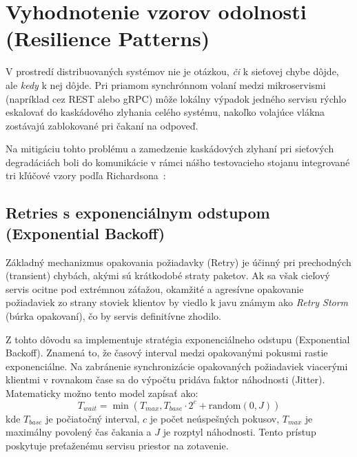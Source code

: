\section{Vyhodnotenie vzorov odolnosti (Resilience Patterns)} \label{s: vzory}

V prostredí distribuovaných systémov nie je otázkou, \textit{či} k sieťovej chybe dôjde, ale \textit{kedy} k nej dôjde. Pri priamom synchrónnom volaní medzi mikroservismi (napríklad cez REST alebo gRPC) môže lokálny výpadok jedného servisu rýchlo eskalovať do kaskádového zlyhania celého systému, nakoľko volajúce vlákna zostávajú zablokované pri čakaní na odpoveď.

Na mitigáciu tohto problému a zamedzenie kaskádových zlyhaní pri sieťových degradáciách boli do komunikácie v rámci nášho testovacieho stojanu integrované tri kľúčové vzory podľa Richardsona~\cite{Richardson2018}:

\subsection{Retries s exponenciálnym odstupom (Exponential Backoff)}
Základný mechanizmus opakovania požiadavky (Retry) je účinný pri prechodných (transient) chybách, akými sú krátkodobé straty paketov. Ak sa však cieľový servis ocitne pod extrémnou záťažou, okamžité a agresívne opakovanie požiadaviek zo strany stoviek klientov by viedlo k javu známym ako \textit{Retry Storm} (búrka opakovaní), čo by servis definitívne zhodilo.

Z tohto dôvodu sa implementuje stratégia exponenciálneho odstupu (Exponential Backoff). Znamená to, že časový interval medzi opakovanými pokusmi rastie exponenciálne. Na zabránenie synchronizácie opakovaných požiadaviek viacerými klientmi v rovnakom čase sa do výpočtu pridáva faktor náhodnosti (Jitter). Matematicky možno tento model zapísať ako:
$$ T_{wait} = \min(T_{max}, T_{base} \cdot 2^c + \text{random}(0, J)) $$
kde $T_{base}$ je počiatočný interval, $c$ je počet neúspešných pokusov, $T_{max}$ je maximálny povolený čas čakania a $J$ je rozptyl náhodnosti. Tento prístup poskytuje preťaženému servisu priestor na zotavenie.

